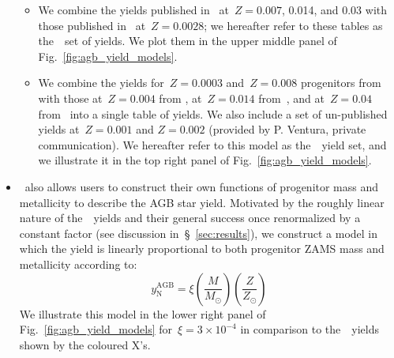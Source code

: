 \documentclass[ms.tex]{subfiles}
\begin{document}
\begin{itemize}
\begin{itemize}
		\item We combine the yields published in~\citet{Karakas2016} 
		at~$Z = 0.007$, 0.014, and 0.03 with those published 
		in~\citet{Karakas2018} at~$Z = 0.0028$; we hereafter refer to these 
		tables as the~\karakas~set of yields. 
		We plot them in the upper middle panel of 
		Fig.~\ref{fig:agb_yield_models}. 

		\item We combine the yields for~$Z = 0.0003$ and~$Z = 0.008$
		progenitors from~\citet{Ventura2013} with those at~$Z = 0.004$ from
		\citet{Ventura2014}, at~$Z = 0.014$ from~\citet{Ventura2018}, and
		at~$Z = 0.04$ from~\citet{Ventura2020} into a single table of yields.
		We also include a set of un-published yields at~$Z = 0.001$ and
		$Z = 0.002$ (provided by P. Ventura, private communication).
		We hereafter refer to this model as the~\ventura~yield set, and we
		illustrate it in the top right panel of Fig.~\ref{fig:agb_yield_models}.
	\end{itemize} 

	\item \vice~also allows users to construct their own functions of 
	progenitor mass and metallicity to describe the AGB star yield. 
	Motivated by the roughly linear nature of the~\cristallo~yields and their 
	general success once renormalized by a constant factor (see discussion 
	in~\S~\ref{sec:results}), we construct a model in which the yield is 
	linearly proportional to both progenitor ZAMS mass and metallicity 
	according to: 
	\begin{equation} 
	y_\text{N}^\text{AGB} = \xi\left(\frac{M}{M_\odot}\right) 
	\left(\frac{Z}{Z_\odot}\right) 
	\label{eq:linear_yield} 
	\end{equation} 
	We illustrate this model in the lower right panel of 
	Fig.~\ref{fig:agb_yield_models} for~$\xi = 3\times10^{-4}$ in comparison to 
	the~\cristallo~yields shown by the coloured X's. 
\end{itemize}
\end{document}
